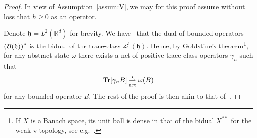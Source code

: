 \documentclass[10pt]{amsart}
\theoremstyle{definition}\newtheorem{defi}[theo]{Definition}\newtheorem{rema}[theo]{Remark}\newtheorem{exam}[theo]{Example}\newtheorem{exem}[theo]{Example}\newtheorem{nota}[theo]{Notation}
\DeclareMathOperator{\Tr}{Tr}
\newcommand{\cL}{\mathcal{L}}
\newcommand{\R}{\mathbb{R}}
\newcommand{\gh}{\mathfrak{h}}
\newcommand{\cB}{\mathcal{B}}
\newcommand{\1}{\mathds{1}}
\newcommand{\cvnet}{\overset{\star}{\underset{\mathrm{net}}{\rightharpoonup}}}
\let\originalleft\left
\let\originalright\right
\renewcommand{\left}{\mathopen{}\mathclose\bgroup\originalleft}
\renewcommand{\right}{\aftergroup\egroup\originalright}
\begin{document}
\begin{proof}
In view of Assumption~\ref{assum:V}, we may for this proof assume without loss that $h\geq 0$ as an operator.

Denote $\gh = L^2 (\R^d)$ for brevity. We have~\cite[Chapter~4]{Schatten-60} that the dual of bounded operators $\left(\cB (\gh)\right)^*$ is the bidual of the trace-class $\cL^1 (\gh)$. Hence, by Goldstine's theorem\footnote{If $X$ is a Banach space, its unit ball is dense in that of the bidual $X^{**}$ for the weak-$\star$ topology, see e.g.~\cite[Exercise~1 p.~128]{Rudin2}.}, for any abstract state $\omega$ there exists a net of positive trace-class operators $\gamma_n$ such that
\begin{equation}\label{eq:density}
\Tr \left[\gamma_n B \right] \cvnet \omega (B)
\end{equation}
for any bounded operator $B$. The rest of the proof is then akin to that of~\cite[Proposition~2.8]{CorFalOli-20}.


\end{proof}
\end{document}
